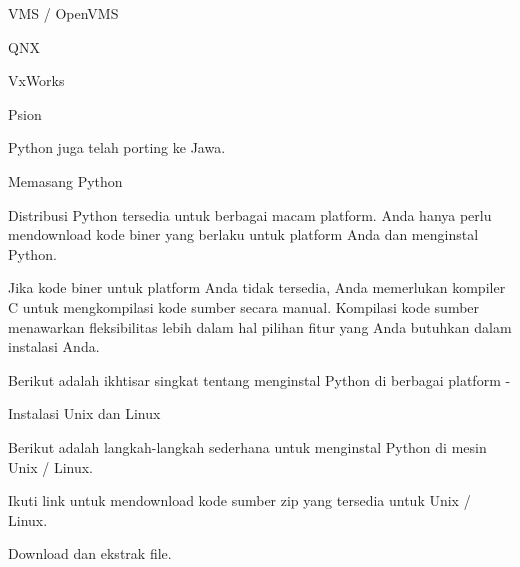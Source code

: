 \noindent 
{\fontsize{14pt}{14pt}\selectfont VMS / OpenVMS \\} \par
\noindent 
{\fontsize{14pt}{14pt}\selectfont QNX \\} \par
\noindent 
{\fontsize{14pt}{14pt}\selectfont VxWorks \\} \par
\noindent 
{\fontsize{14pt}{14pt}\selectfont Psion \\} \par
\noindent 
{\fontsize{14pt}{14pt}\selectfont Python juga telah porting ke Jawa. \\} \par
\noindent 
{\fontsize{14pt}{14pt}\selectfont Memasang Python \\} \par
\noindent 
{\fontsize{14pt}{14pt}\selectfont Distribusi Python tersedia untuk berbagai macam platform. Anda hanya perlu mendownload kode biner yang berlaku untuk platform Anda dan menginstal Python. \\} \par
\vspace{14pt}
\noindent 
{\fontsize{14pt}{14pt}\selectfont Jika kode biner untuk platform Anda tidak tersedia, Anda memerlukan kompiler C untuk mengkompilasi kode sumber secara manual. Kompilasi kode sumber menawarkan fleksibilitas lebih dalam hal pilihan fitur yang Anda butuhkan dalam instalasi Anda. \\} \par
\vspace{14pt}
\noindent 
{\fontsize{14pt}{14pt}\selectfont Berikut adalah ikhtisar singkat tentang menginstal Python di berbagai platform - \\} \par
\vspace{14pt}
\noindent 
{\fontsize{14pt}{14pt}\selectfont Instalasi Unix dan Linux \\} \par
\noindent 
{\fontsize{14pt}{14pt}\selectfont Berikut adalah langkah-langkah sederhana untuk menginstal Python di mesin Unix / Linux. \\} \par
\noindent 
{\fontsize{14pt}{14pt}\selectfont Ikuti link untuk mendownload kode sumber zip yang tersedia untuk Unix / Linux. \\} \par
\vspace{14pt}
\noindent 
{\fontsize{14pt}{14pt}\selectfont Download dan ekstrak file. \\} \par
